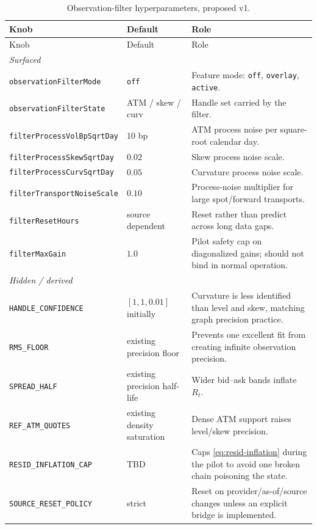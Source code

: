 \documentclass[11pt]{article}
\begin{document}
\begingroup
\small
\begin{longtable}{p{}p{}p{}}
\caption{Observation-filter hyperparameters, proposed v1.}\label{tab:atlas}\\
\toprule Knob & Default & Role\\ \midrule
\endfirsthead \toprule Knob & Default & Role\\ \midrule \endhead
\multicolumn{3}{l}{\emph{Surfaced}}\\ \midrule
\texttt{observationFilterMode} & \texttt{off} & Feature mode:
\texttt{off}, \texttt{overlay}, \texttt{active}.\\
\texttt{observationFilterState} & ATM / skew / curv & Handle set carried by the
filter.\\
\texttt{filterProcessVolBpSqrtDay} & $10$ bp & ATM process noise per square-root
calendar day.\\
\texttt{filterProcessSkewSqrtDay} & $0.02$ & Skew process noise scale.\\
\texttt{filterProcessCurvSqrtDay} & $0.05$ & Curvature process noise scale.\\
\texttt{filterTransportNoiseScale} & $0.10$ & Process-noise multiplier for
large spot/forward transports.\\
\texttt{filterResetHours} & source dependent & Reset rather than predict across
long data gaps.\\
\texttt{filterMaxGain} & $1.0$ & Pilot safety cap on diagonalized gains; should
not bind in normal operation.\\
\midrule
\multicolumn{3}{l}{\emph{Hidden / derived}}\\ \midrule
\texttt{HANDLE\_CONFIDENCE} & $[1,1,0.01]$ initially & Curvature is less
identified than level and skew, matching graph precision practice.\\
\texttt{RMS\_FLOOR} & existing precision floor & Prevents one excellent fit from
creating infinite observation precision.\\
\texttt{SPREAD\_HALF} & existing precision half-life & Wider bid--ask bands
inflate $R_t$.\\
\texttt{REF\_ATM\_QUOTES} & existing density saturation & Dense ATM support
raises level/skew precision.\\
\texttt{RESID\_INFLATION\_CAP} & TBD & Caps \eqref{eq:resid-inflation} during
the pilot to avoid one broken chain poisoning the state.\\
\texttt{SOURCE\_RESET\_POLICY} & strict & Reset on provider/as-of/source changes
unless an explicit bridge is implemented.\\
\bottomrule
\end{longtable}
\endgroup
\end{document}
